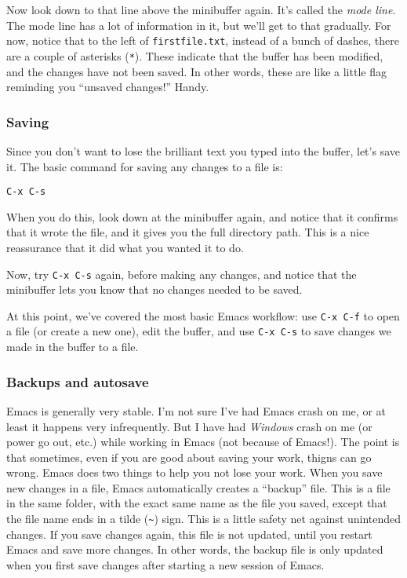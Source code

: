 \documentclass{article}
\begin{document}
Now look down to that line above the minibuffer again. It's called the \emph{mode line}.  The mode line has a lot of information in it, but we'll get to that gradually.  For now, notice that to the left of \texttt{firstfile.txt}, instead of a bunch of dashes, there are a couple of asterisks (\texttt{*}).  These indicate that the buffer has been modified, and the changes have not been saved.  In other words, these are like a little flag reminding you ``unsaved changes!'' Handy.
\subsubsection{Saving}
\label{sec-4-2-9}

Since you don't want to lose the brilliant text you typed into the buffer, let's save it. The basic command for saving any changes to a file is:


\begin{verbatim}
C-x C-s
\end{verbatim}

When you do this, look down at the minibuffer again, and notice that it confirms that it wrote the file, and it gives you the full directory path.  This is a nice reassurance that it did what you wanted it to do.

Now, try \texttt{C-x C-s} again, before making any changes, and notice that the minibuffer lets you know that no changes needed to be saved.

At this point, we've covered the most basic Emacs workflow: use \texttt{C-x C-f} to open a file (or create a new one), edit the buffer, and use \texttt{C-x C-s} to save changes we made in the buffer to a file.
\subsubsection{Backups and autosave}
\label{sec-4-2-10}

Emacs is generally very stable.  I'm not sure I've had Emacs crash on me, or at least it happens very infrequently.  But I have had \emph{Windows} crash on me (or power go out, etc.) while working in Emacs (not because of Emacs!). The point is that sometimes, even if you are good about saving your work, thigns can go wrong.  Emacs does two things to help you not lose your work.  When you save new changes in a file, Emacs automatically creates a ``backup'' file.  This is a file in the same folder, with the exact same name as the file you saved, except that the file name ends in a tilde (\texttt{\textasciitilde{}}) sign. This is a little safety net against unintended changes. If you save changes again, this file is not updated, until you restart Emacs and save more changes. In other words, the backup file is only updated when you first save changes after starting a new session of Emacs.
\end{document}
